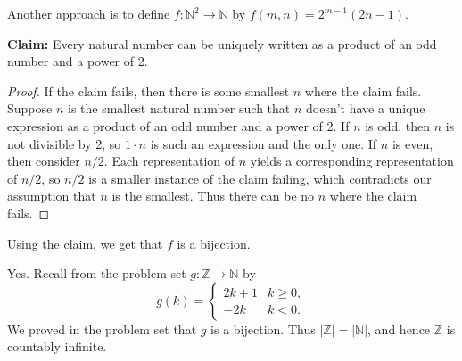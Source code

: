 \documentclass[12pt,letterpaper]{article}
\begin{document}
\begin{enumerate}
	
Another approach is to define $f:\mathbb{N}^2\to \mathbb{N}$ by $f(m,n)=2^{m-1}(2n-1)$.

{\bf Claim:} Every natural number can be uniquely written as a product of an odd number and a power of 2.

\begin{proof}
If the claim fails, then there is some smallest $n$ where the claim fails. Suppose $n$ is the smallest natural number such that $n$ doesn't have a unique expression as a product of an odd number and a power of 2. If $n$ is odd, then $n$ is not divisible by 2, so $1\cdot n$ is such an expression and the only one. If $n$ is even, then consider $n/2$. Each representation of $n$ yields a corresponding representation of $n/2$, so $n/2$ is a smaller instance of the claim failing, which contradicts our assumption that $n$ is the smallest. Thus there can be no $n$ where the claim fails.
\end{proof}

Using the claim, we get that $f$ is a bijection.
  
  \Answer Yes. Recall from the problem set $g:\mathbb{Z}\to \mathbb{N}$ by $$g(k)=\begin{cases} 2k+1 & k\geq 0,\\ -2k & k<0.\end{cases}$$ We proved in the problem set that $g$ is a bijection. Thus $|\mathbb{Z}|=|\mathbb{N}|$, and hence $\mathbb{Z}$ is countably infinite.
  
  \Answer 
  

\end{enumerate}
\end{document}
